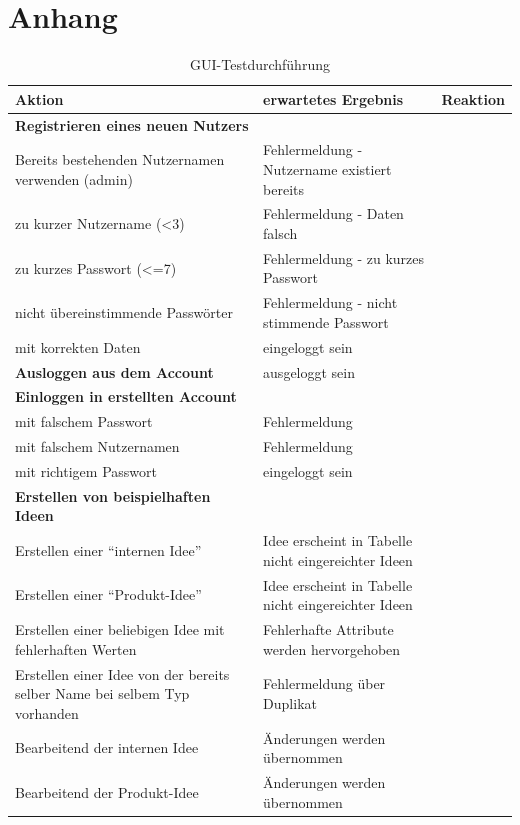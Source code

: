 \section*{Anhang}

\anhangsverzeichnis


\begin{center}
\label{fig:testdurchf}
\begin{longtable}{|p{}|p{}|p{}|}
\caption{GUI-Testdurchführung}\\
\hline
Aktion & erwartetes Ergebnis & Reaktion\\
\hline
\hline

\textbf{Registrieren eines neuen Nutzers} & &\\
\hline
Bereits bestehenden Nutzernamen verwenden (admin) & Fehlermeldung - Nutzername existiert bereits &\\
\hline
zu kurzer Nutzername (<3) & Fehlermeldung - Daten falsch &\\
\hline
zu kurzes Passwort (<=7) & Fehlermeldung - zu kurzes Passwort &\\
\hline
nicht übereinstimmende Passwörter & Fehlermeldung - nicht stimmende Passwort &\\
\hline
mit korrekten Daten & eingeloggt sein &\\
\hline
\hline

\textbf{Ausloggen aus dem Account} & ausgeloggt sein &\\
\hline
\hline

\textbf{Einloggen in erstellten Account} & &\\
\hline
mit falschem Passwort & Fehlermeldung &\\
\hline
mit falschem Nutzernamen & Fehlermeldung &\\
\hline
mit richtigem Passwort & eingeloggt sein &\\
\hline
\hline

\textbf{Erstellen von beispielhaften Ideen} & &\\
\hline
Erstellen einer \enquote{internen Idee} & Idee erscheint in Tabelle nicht eingereichter Ideen &\\
\hline
Erstellen einer \enquote{Produkt-Idee} & Idee erscheint in Tabelle nicht eingereichter Ideen &\\
\hline
Erstellen einer beliebigen Idee mit fehlerhaften Werten & Fehlerhafte Attribute werden hervorgehoben &\\
\hline
Erstellen einer Idee von der bereits selber Name bei selbem Typ vorhanden & Fehlermeldung über Duplikat &\\
\hline
Bearbeitend der internen Idee & Änderungen werden übernommen &\\
\hline
Bearbeitend der Produkt-Idee & Änderungen werden übernommen &\\
\hline
\hline


\end{longtable}
\end{center}

